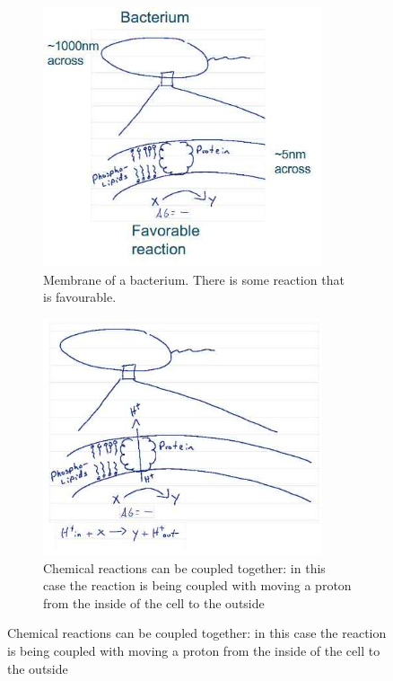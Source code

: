 \documentclass[]{article}
\begin{document}
\begin{figure}[H]
	\caption{How do cells use their membranes to couple chemical reactions?}
	\begin{subfigure}[t]{0.45\textwidth}
		\caption{Membrane of a bacterium. There is some reaction that is favourable.}\label{fig:ChemioOsmosis0}
		\includegraphics[width=0.9\textwidth]{ChemioOsmosis0}
	\end{subfigure}
	\begin{subfigure}[t]{0.45\textwidth}
		\caption{Chemical reactions can be coupled together: in this case the reaction is being coupled with moving a proton from the inside of the cell to the outside}\label{fig:ChemioOsmosis1}
		\includegraphics[width=0.9\textwidth]{ChemioOsmosis1}

\end{subfigure}
\end{figure}
\end{document}
